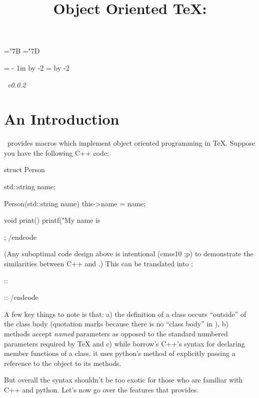 \chardef\lbrace="7B
\chardef\rbrace="7D

\def\parameter#1{$\langle$#1$\rangle$}
\def\cparameter#1{$\{\langle$#1$\rangle\}$}
\def\bparameter#1{$[\langle$#1$\rangle]$}

\parindent=0pt
\parskip=3pt
\hoffset=\dimexpr 1.5cm - 1in \relax
\advance\hsize by -2\hoffset
\voffset=\hoffset
\advance\vsize by -2\voffset

\title{Object Oriented \TeX: \OoP\par}
\hfill \OoP\ {\it v0.0.2}\par

\section{An Introduction}

\OoP\ provides macros which implement object oriented programming in \TeX. Suppose you have the following C++ code:

\begincode
struct Person {
    std::string name;

    Person(std::string name) {
        this->name = name;
    }

    void print() {
        printf("My name is %
    }
};
/endcode

(Any suboptimal code design above is intentional ({\fontuse cmss10 ;p}) to demonstrate the similarities between C++ and \OoP.)
This can be translated into \OoP:

\begincode
\class\Person

\method\Person::

\method\Person::
/endcode

A few key things to note is that: a) the definition of a class occurs ``outside'' of the class body
(quotation marks because there is no ``class body'' in \OoP), b) methods accept {\it named} parameters
as opposed to the standard numbered parameters required by \TeX{} and c) while \OoP{} borrow's C++'s
syntax for declaring member functions of a class, it uses python's method of explicitly passing a
reference to the object to its methods.

But overall the syntax shouldn't be too exotic for those who are familiar with C++ and python.
Let's now go over the features that \OoP provides.

\section{\OoP}

